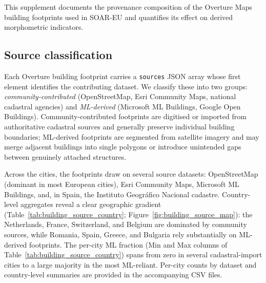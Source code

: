 This supplement documents the provenance composition of the Overture Maps building footprints used in SOAR-EU and quantifies its effect on derived morphometric indicators.

\subsection{Source classification}
\label{sec:bldg-supp-classification}

Each Overture building footprint carries a \texttt{sources} JSON array whose first element identifies the contributing dataset. We classify these into two groups: \emph{community-contributed} (OpenStreetMap, Esri Community Maps, national cadastral agencies) and \emph{ML-derived} (Microsoft ML Buildings, Google Open Buildings). Community-contributed footprints are digitised or imported from authoritative cadastral sources and generally preserve individual building boundaries; ML-derived footprints are segmented from satellite imagery and may merge adjacent buildings into single polygons or introduce unintended gaps between genuinely attached structures.

Across the \NCitiesTotal{} cities, the footprints draw on several source datasets: OpenStreetMap (dominant in most European cities), Esri Community Maps, Microsoft ML Buildings, and, in Spain, the Instituto Geogr\'{a}fico Nacional cadastre. Country-level aggregates reveal a clear geographic gradient (Table~\ref{tab:building_source_country}; Figure~\ref{fig:building_source_map}): the Netherlands, France, Switzerland, and Belgium are dominated by community sources, while Romania, Spain, Greece, and Bulgaria rely substantially on ML-derived footprints. The per-city ML fraction (Min and Max columns of Table~\ref{tab:building_source_country}) spans from zero in several cadastral-import cities to a large majority in the most ML-reliant. Per-city counts by dataset and country-level summaries are provided in the accompanying CSV files.

\begin{table}[!htb]
  \centering
  \caption{Building footprint source composition by country, sorted by ML-derived fraction (ascending). ML~(\%) is the proportion of footprints from ML-derived sources (primarily Microsoft ML Buildings); Min and Max show the per-city range within each country.}
  \label{tab:building_source_country}
  \scriptsize
  
\end{table}

